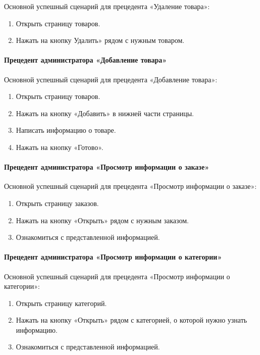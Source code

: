 Основной успешный сценарий для прецедента «Удаление товара»:
\begin{enumerate}
	\item Открыть страницу товаров.
	\item Нажать на кнопку Удалить» рядом с нужным товаром.
\end{enumerate}

\paragraph{Прецедент администратора «Добавление товара»}

Основной успешный сценарий для прецедента «Добавление товара»:
\begin{enumerate}
	\item Открыть страницу товаров.
	\item Нажать на кнопку «Добавить» в нижней части страницы.
	\item Написать информацию о товаре.
	\item Нажать на кнопку «Готово».
\end{enumerate}

\paragraph{Прецедент администратора «Просмотр информации о заказе»}

Основной успешный сценарий для прецедента «Просмотр информации о заказе»:
\begin{enumerate}
	\item Открыть страницу заказов.
	\item Нажать на кнопку «Открыть» рядом с нужным заказом.
	\item Ознакомиться с представленной информацией.
\end{enumerate}

\paragraph{Прецедент администратора «Просмотр информации о категории»}

Основной успешный сценарий для прецедента «Просмотр информации о категории»:
\begin{enumerate}
	\item Открыть страницу категорий.
	\item Нажать на кнопку «Открыть» рядом с категорией, о которой нужно узнать информацию.
	\item Ознакомиться с представленной информацией.
\end{enumerate}

